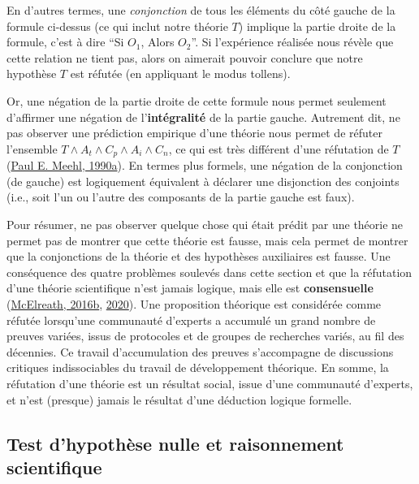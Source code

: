 \documentclass[
  a4paper,11pt,twoside,onecolumn,openright,final,oldfontcommands]{memoir}
\theoremstyle{definition}
\theoremstyle{definition}
\theoremstyle{definition}
\theoremstyle{definition}
\theoremstyle{remark}
\begin{document}
En d'autres termes, une \emph{conjonction} de tous les éléments du côté gauche de la formule ci-dessus (ce qui inclut notre théorie \(T\)) implique la partie droite de la formule, c'est à dire ``Si \(O_{1}\), Alors \(O_{2}\)''. Si l'expérience réalisée nous révèle que cette relation ne tient pas, alors on aimerait pouvoir conclure que notre hypothèse \(T\) est réfutée (en appliquant le modus tollens).

Or, une négation de la partie droite de cette formule nous permet seulement d'affirmer une négation de l'\textbf{intégralité} de la partie gauche. Autrement dit, ne pas observer une prédiction empirique d'une théorie nous permet de réfuter l'ensemble \(T \land A_{t} \land C_{p} \land A_{i} \land C_{n}\), ce qui est très différent d'une réfutation de \(T\) (\protect\hyperlink{ref-meehl_appraising_1990}{Paul E. Meehl, 1990a}). En termes plus formels, une négation de la conjonction (de gauche) est logiquement équivalent à déclarer une disjonction des conjoints (i.e., soit l'un ou l'autre des composants de la partie gauche est faux).

Pour résumer, ne pas observer quelque chose qui était prédit par une théorie ne permet pas de montrer que cette théorie est fausse, mais cela permet de montrer que la conjonctions de la théorie et des hypothèses auxiliaires est fausse. Une conséquence des quatre problèmes soulevés dans cette section et que la réfutation d'une théorie scientifique n'est jamais logique, mais elle est \textbf{consensuelle} (\protect\hyperlink{ref-mcelreath_statistical_2016}{McElreath, 2016b}, \protect\hyperlink{ref-mcelreath_statistical_2020}{2020}). Une proposition théorique est considérée comme réfutée lorsqu'une communauté d'experts a accumulé un grand nombre de preuves variées, issus de protocoles et de groupes de recherches variés, au fil des décennies. Ce travail d'accumulation des preuves s'accompagne de discussions critiques indissociables du travail de développement théorique. En somme, la réfutation d'une théorie est un résultat social, issue d'une communauté d'experts, et n'est (presque) jamais le résultat d'une déduction logique formelle.

\hypertarget{test-dhypothuxe8se-nulle-et-raisonnement-scientifique}{%
\subsection{Test d'hypothèse nulle et raisonnement scientifique}\label{test-dhypothuxe8se-nulle-et-raisonnement-scientifique}}
\end{document}
